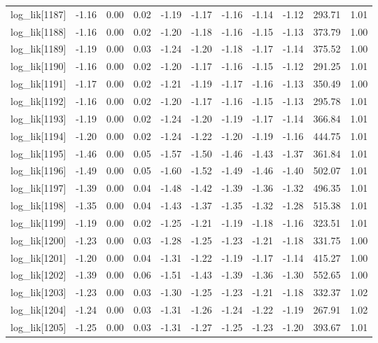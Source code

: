 \begin{table}[ht]
\begin{tabular}{rrrrrrrrrrr}
  log\_lik[1187] & -1.16 & 0.00 & 0.02 & -1.19 & -1.17 & -1.16 & -1.14 & -1.12 & 293.71 & 1.01 \\ 
  log\_lik[1188] & -1.16 & 0.00 & 0.02 & -1.20 & -1.18 & -1.16 & -1.15 & -1.13 & 373.79 & 1.00 \\ 
  log\_lik[1189] & -1.19 & 0.00 & 0.03 & -1.24 & -1.20 & -1.18 & -1.17 & -1.14 & 375.52 & 1.00 \\ 
  log\_lik[1190] & -1.16 & 0.00 & 0.02 & -1.20 & -1.17 & -1.16 & -1.15 & -1.12 & 291.25 & 1.01 \\ 
  log\_lik[1191] & -1.17 & 0.00 & 0.02 & -1.21 & -1.19 & -1.17 & -1.16 & -1.13 & 350.49 & 1.00 \\ 
  log\_lik[1192] & -1.16 & 0.00 & 0.02 & -1.20 & -1.17 & -1.16 & -1.15 & -1.13 & 295.78 & 1.01 \\ 
  log\_lik[1193] & -1.19 & 0.00 & 0.02 & -1.24 & -1.20 & -1.19 & -1.17 & -1.14 & 366.84 & 1.01 \\ 
  log\_lik[1194] & -1.20 & 0.00 & 0.02 & -1.24 & -1.22 & -1.20 & -1.19 & -1.16 & 444.75 & 1.01 \\ 
  log\_lik[1195] & -1.46 & 0.00 & 0.05 & -1.57 & -1.50 & -1.46 & -1.43 & -1.37 & 361.84 & 1.01 \\ 
  log\_lik[1196] & -1.49 & 0.00 & 0.05 & -1.60 & -1.52 & -1.49 & -1.46 & -1.40 & 502.07 & 1.01 \\ 
  log\_lik[1197] & -1.39 & 0.00 & 0.04 & -1.48 & -1.42 & -1.39 & -1.36 & -1.32 & 496.35 & 1.01 \\ 
  log\_lik[1198] & -1.35 & 0.00 & 0.04 & -1.43 & -1.37 & -1.35 & -1.32 & -1.28 & 515.38 & 1.01 \\ 
  log\_lik[1199] & -1.19 & 0.00 & 0.02 & -1.25 & -1.21 & -1.19 & -1.18 & -1.16 & 323.51 & 1.01 \\ 
  log\_lik[1200] & -1.23 & 0.00 & 0.03 & -1.28 & -1.25 & -1.23 & -1.21 & -1.18 & 331.75 & 1.00 \\ 
  log\_lik[1201] & -1.20 & 0.00 & 0.04 & -1.31 & -1.22 & -1.19 & -1.17 & -1.14 & 415.27 & 1.00 \\ 
  log\_lik[1202] & -1.39 & 0.00 & 0.06 & -1.51 & -1.43 & -1.39 & -1.36 & -1.30 & 552.65 & 1.00 \\ 
  log\_lik[1203] & -1.23 & 0.00 & 0.03 & -1.30 & -1.25 & -1.23 & -1.21 & -1.18 & 332.37 & 1.02 \\ 
  log\_lik[1204] & -1.24 & 0.00 & 0.03 & -1.31 & -1.26 & -1.24 & -1.22 & -1.19 & 267.91 & 1.02 \\ 
  log\_lik[1205] & -1.25 & 0.00 & 0.03 & -1.31 & -1.27 & -1.25 & -1.23 & -1.20 & 393.67 & 1.01 \\ 

\end{tabular}
\end{table}
